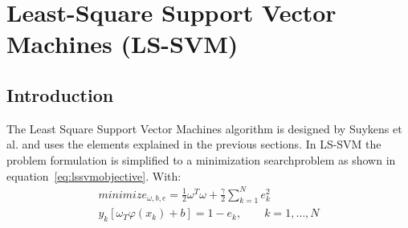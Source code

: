 \section{Least-Square Support Vector Machines (LS-SVM)}
\subsection{Introduction}
The Least Square Support Vector Machines algorithm is designed by Suykens et al. and uses the elements explained in the previous sections. \cite{Suykens2002}
In LS-SVM the problem formulation is simplified to a minimization searchproblem as shown in equation~\ref{eq:lssvmobjective}.
With:
\begin{equation}
	\begin{split}
		minimize_{\omega,b,e} = \frac{1}{2} \omega^T \omega + \frac{\gamma}{2} \sum_{k=1}^{N}e^2_k \\
		y_k \left[\omega_T \varphi(x_k)+b\right]=1-e_k, \qquad k = 1,\dots,N
	\end{split}
	\label{eq:lssvmobjective}
\end{equation}
